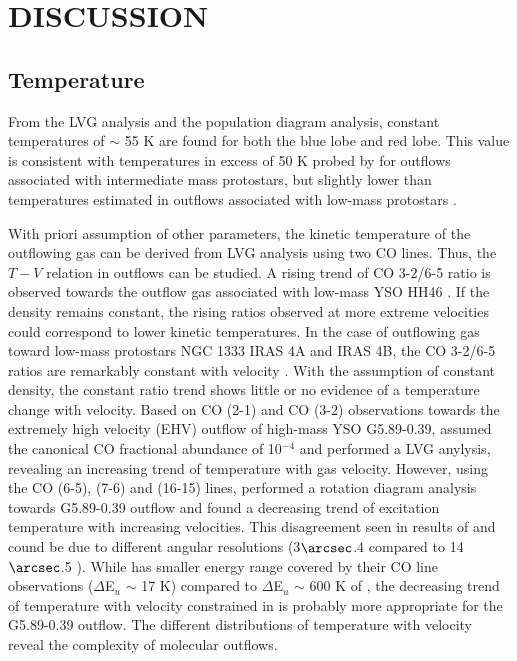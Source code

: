 \section{DISCUSSION}\label{discussion}

\subsection{Temperature}
From the LVG analysis and the population diagram analysis, constant temperatures of $\sim$ 55 K are found for both the blue lobe and red lobe. This value is consistent with temperatures in excess of 50 K probed by \citet{2016A&A...587A..17V} for outflows associated with intermediate mass protostars, but slightly lower than temperatures estimated in outflows associated with low-mass protostars \citep{2009A&A...501..633V, 2012A&A...542A..86Y}.

With priori assumption of other parameters, the kinetic temperature of the outflowing gas can be derived from LVG analysis using two CO lines. Thus, the $T-V$ relation in outflows can be studied. A rising trend of CO 3-2/6-5 ratio is observed towards the outflow gas associated with low-mass YSO HH46 \citep{2009A&A...501..633V}. If the density remains constant, the rising ratios observed at more extreme velocities could correspond to lower kinetic temperatures. In the case of outflowing gas toward low-mass protostars NGC 1333 IRAS 4A and  IRAS 4B, the CO 3-2/6-5 ratios are remarkably constant with velocity \citep{2012A&A...542A..86Y}. With the assumption of constant density, the constant ratio trend shows little or no evidence of a temperature change with velocity. Based on CO (2-1) and CO (3-2) observations towards the extremely high velocity (EHV) outflow of high-mass YSO G5.89-0.39, \citet{2012ApJ...744L..26S} assumed the canonical CO fractional abundance of 10$^{-4}$ and performed a LVG anylysis, revealing an increasing trend of temperature with gas velocity. However, using the CO (6-5), (7-6) and (16-15) lines, \citet{2015A&A...584A..70L} performed a rotation diagram analysis towards G5.89-0.39 outflow and found a decreasing trend of excitation temperature with increasing velocities. This disagreement seen in results of \citet{2012ApJ...744L..26S} and \citet{2015A&A...584A..70L} cound be due to different angular resolutions (3${\arcsec}$.4 compared to 14${\arcsec}$.5 ). While \citet{2012ApJ...744L..26S} has smaller energy range covered by their CO line observations ($\Delta$E$_u$ $\sim$ 17 K) compared to $\Delta$E$_u$ $\sim$ 600 K of \citet{2015A&A...584A..70L}, the decreasing trend of temperature with velocity constrained in \citet{2015A&A...584A..70L} is probably more appropriate for the G5.89-0.39 outflow. The different distributions of temperature with velocity reveal the complexity of molecular outflows. 

